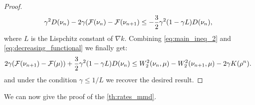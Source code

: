 \begin{proof}
	\begin{align}
	\gamma^2 D(\nu_n) -2\gamma ({{\mathcal F}}(\nu_n)-{{\mathcal F}}(\nu_{n+1})\leq -\frac{3}{2}\gamma^2 (1-\gamma L)D(\nu_n),
	\label{eq:decreasing_functional}
	\end{align}
	where $L$ is the Lispchitz constant of $\nabla k$. Combining  \cref{eq:main_ineq_2} and \cref{eq:decreasing_functional} we finally get:
	\begin{align}
	2\gamma({{\mathcal F}}(\nu_{n+1})-{{\mathcal F}}(\mu))+\frac{3}{2}\gamma^2(1-\gamma L)D(\nu_n)
	\leq 
	W_2^2(\nu_n,\mu)-W_2^2(\nu_{n+1},\mu)-2\gamma K(\rho^n).
	\label{eq:main_final}
	\end{align}
	and under the condition $\gamma\le 1/L$ we recover the desired result.
\end{proof}

We can now give the proof of the \cref{th:rates_mmd}.

